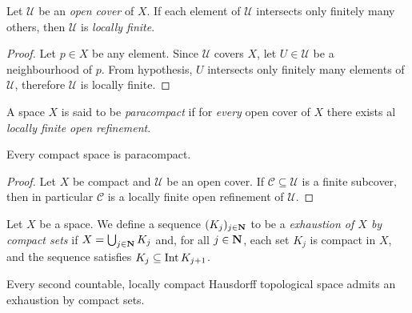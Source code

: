 \begin{corollary}
    \label{cor:open-cover-finite-intersection-is-locally-finite}
    Let \(\mathcal{U}\) be an \emph{open cover} of \(X\). If each element of
    \(\mathcal{U}\) intersects only finitely many others, then \(\mathcal{U}\) is
    \emph{locally finite}.
\end{corollary}

\begin{proof}
    Let \(p \in X\) be any element. Since \(\mathcal{U}\) covers \(X\), let
    \(U \in \mathcal{U}\) be a neighbourhood of \(p\). From hypothesis, \(U\)
    intersects only finitely many elements of \(\mathcal{U}\), therefore
    \(\mathcal{U}\) is locally finite.
\end{proof}

\begin{definition}[Paracompactness]
    \label{def:paracompact}
    A space \(X\) is said to be \emph{paracompact} if for \emph{every} open cover
    of \(X\) there exists al \emph{locally finite open refinement}.
\end{definition}

\begin{corollary}
    \label{cor:compact-is-paracompact}
    Every compact space is paracompact.
\end{corollary}

\begin{proof}
    Let \(X\) be compact and \(\mathcal{U}\) be an open cover. If
    \(\mathcal{C} \subseteq \mathcal{U}\) is a finite subcover, then in particular
    \(\mathcal{C}\) is a locally finite open refinement of \(\mathcal{U}\).
\end{proof}

\begin{definition}
    \label{def:compact-exhaustion}
    Let \(X\) be a space. We define a sequence \((K_j)_{j \in \mathbf{N}}\) to be a
    \emph{exhaustion of \(X\) by compact sets} if \(X = \bigcup_{j \in \mathbf{N}} K_j\)
    and, for all \(j \in \mathbf{N}\), each set \(K_j\) is compact in \(X\), and the
    sequence satisfies \(K_j \subseteq \operatorname{Int} K_{j + 1}\).
\end{definition}

\begin{lemma}
    \label{lem:2nd-loc-cpct-haus-exhaustion}
    Every second countable, locally compact Hausdorff topological space admits an
    exhaustion by compact sets.
\end{lemma}

